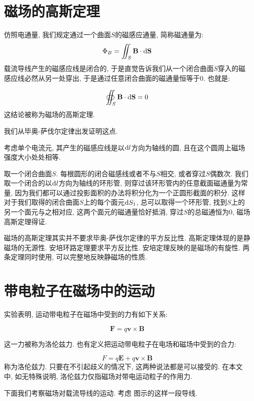 \section{磁场的高斯定理}
仿照电通量, 我们规定通过一个曲面$S$的磁感应通量, 简称磁通量为:
\[
\Phi_B= \iint_S \mathbf{B}\cdot \mathop{}\!\mathrm{d}\mathbf S
\]
载流导线产生的磁感应线是闭合的, 于是直觉告诉我们从一个闭合曲面$S$穿入的磁感应线必然从另一处穿出, 于是通过任意闭合曲面的磁通量恒等于$0$. 也就是:
\begin{theorem}[磁场高斯定理]


\[
\oiint_S \mathbf{B}\cdot \mathop{}\!\mathrm{d}\mathbf S=0
\]
这结论被称为磁场的高斯定理.
\end{theorem}

我们从毕奥-萨伐尔定律出发证明这点.

考虑单个电流元, 其产生的磁感应线是以$\mathop{}\!\mathrm{d} l$方向为轴线的圆, 且在这个圆周上磁场强度大小处处相等.

取一个闭合曲面$S$. 每根圆形的闭合磁感线或者不与$S$相交, 或者穿过$S$偶数次. 我们取一个闭合的以$\mathop{}\!\mathrm{d} l$方向为轴线的环形管, 则穿过该环形管内的任意截面磁通量为常量, 因为我们都可以通过投影面积的办法将积分化为一个正圆形截面的积分. 这样对于我们取得的闭合曲面$S$上的每个面元$\mathop{}\!\mathrm{d} S_1$, 总可以取得一个环形管, 找到$S$上的另一个面元与之相对应, 这两个面元的磁通量恰好抵消, 穿过$S$的总磁通恒为$0$, 磁场高斯定理得证.

磁场的高斯定理其实并不要求毕奥-萨伐尔定律的平方反比性. 高斯定理体现的是静磁场的无源性. 安培环路定理要求平方反比性. 安培定理反映的是磁场的有旋性. 两条定理同时使用, 可以完整地反映静磁场的性质.

\section{带电粒子在磁场中的运动}
实验表明, 运动带电粒子在磁场中受到的力有如下关系:
\begin{definition}[洛伦兹力]
  \[
\mathbf{F}=q\mathbf{v}\times \mathbf{B}
\]
\end{definition}

这一力被称为洛伦兹力. 也有定义把运动带电粒子在电场和磁场中受到的合力:

\[
F = q\mathbf{E}+q\mathbf{v}\times\mathbf{B}
\]
称为洛伦兹力. 只要在不引起歧义的情况下, 这两种说法都是可以接受的. 在本文中, 如无特殊说明, 洛伦兹力仅指磁场对带电运动粒子的作用力.

下面我们考察磁场对载流导线的运动. 考虑
图示的这样一段导线.


